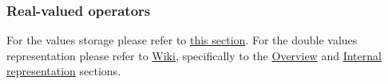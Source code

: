 \subsubsection{Real-valued operators}


\vspace{0.5cm}

For the  values storage please refer to
\hyperlink{types:two_words_storage}{this section}.
For the double values representation please refer to
\href{https://en.wikipedia.org/wiki/Floating-point_arithmetic}{Wiki},
specifically to the
\href{https://en.wikipedia.org/wiki/Floating-point_arithmetic#Floating-point_numbers}
{Overview} and
\href{https://en.wikipedia.org/wiki/Floating-point_arithmetic#Internal_representation}
{Internal representation} sections.

\vspace{-0.35cm}

\paragraph{}\

